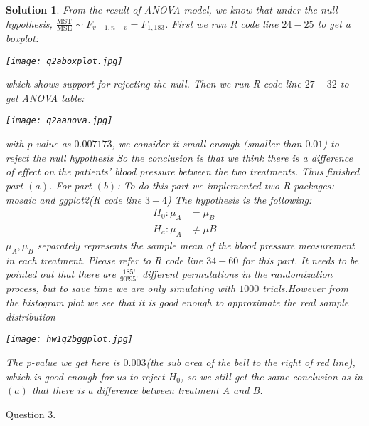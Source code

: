 \documentclass[11pt]{article}
\newtheorem{sol}{Solution}
\begin{document}
\begin{sol}
	From the result of ANOVA model, we know that under the null hypothesis,  $\frac{\text{MST}}{\text{MSE}} \sim F_{v-1, n - v} = F_{1, 183}$. 
	First we run R code line $24-25$ to get a boxplot:\vskip 2mm
	\begin{center}
	\texttt{[image: q2aboxplot.jpg]}
	\end{center}
	which shows support for rejecting the null.\vskip 2mm
	Then we run R code line $27-32$ to get ANOVA table:\vskip 2mm
	\begin{center}
	\texttt{[image: q2aanova.jpg]}
	\end{center}
	with $p$ value as $0.007173$, we consider it small enough (smaller than $0.01$) to reject the null hypothesis\vskip 2mm
	So the conclusion is that we think there is a difference of effect on the patients' blood pressure between the two treatments.\vskip 2mm
	Thus finished part $(a)$.\vskip 2mm
	For part $(b)$:\vskip 2mm
	To do this part we implemented two R packages: mosaic and ggplot2(R code line $3-4$)\vskip 2mm
	The hypothesis is the following:
	\begin{align*}
		H_0: \mu_A &= \mu_B\\
		H_a: \mu_A &\neq \mu B
	\end{align*}
	$\mu_A, \mu_B$ separately represents the sample mean of the blood pressure measurement in each treatment.\vskip 2mm
	Please refer to R code line $34-60$ for this part. \vskip 2mm
	It needs to be pointed out that there are $\frac{185!}{90!95!}$ different permutations in the randomization process, but to save time we are only simulating with $1000$ trials.However from the histogram plot we see that it is good enough to approximate the real sample distribution\vskip 2mm
	\begin{center}
	\texttt{[image: hw1q2bggplot.jpg]}
	\end{center}
	The p-value we get here is $0.003$(the sub area of the bell to the right of red line), which is good enough for us to reject $H_0$, so we still get the same conclusion as in $(a)$ that there is a difference between treatment A and B.
	
\end{sol}
Question 3.
\end{document}

